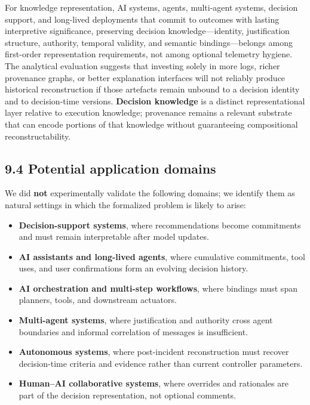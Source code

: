 \documentclass[11pt,a4paper]{article}
\begin{document}
For knowledge representation, AI systems, agents, multi-agent systems, decision support, and long-lived deployments that commit to outcomes with lasting interpretive significance, preserving decision knowledge---identity, justification structure, authority, temporal validity, and semantic bindings---belongs among first-order representation requirements, not among optional telemetry hygiene. The analytical evaluation suggests that investing solely in more logs, richer provenance graphs, or better explanation interfaces will not reliably produce historical reconstruction if those artefacts remain unbound to a decision identity and to decision-time versions. \textbf{Decision knowledge} is a distinct representational layer relative to execution knowledge; provenance remains a relevant substrate that can encode portions of that knowledge without guaranteeing compositional reconstructability.


\subsection{9.4 Potential application domains}

We did \textbf{not} experimentally validate the following domains; we identify them as natural settings in which the formalized problem is likely to arise:


\begin{itemize}
\item \textbf{Decision-support systems}, where recommendations become commitments and must remain interpretable after model updates.
\item \textbf{AI assistants and long-lived agents}, where cumulative commitments, tool uses, and user confirmations form an evolving decision history.
\item \textbf{AI orchestration and multi-step workflows}, where bindings must span planners, tools, and downstream actuators.
\item \textbf{Multi-agent systems}, where justification and authority cross agent boundaries and informal correlation of messages is insufficient.
\item \textbf{Autonomous systems}, where post-incident reconstruction must recover decision-time criteria and evidence rather than current controller parameters.
\item \textbf{Human--AI collaborative systems}, where overrides and rationales are part of the decision representation, not optional comments.
\end{itemize}
\end{document}
